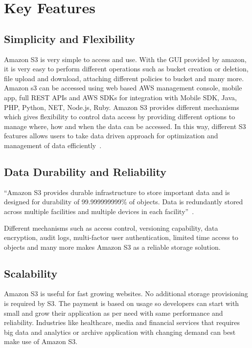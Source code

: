 \section{Key Features}


\subsection{Simplicity and Flexibility} 

Amazon S3 is very simple to access and use. With the GUI provided by amazon,
it is very easy to perform different operations such as bucket creation or
deletion, file upload and download, attaching different policies to bucket and 
many more. Amazon s3 can be accessed using web based AWS management console, 
mobile app, full REST APIs and AWS SDKs for integration with Mobile SDK, Java, 
PHP, Python, NET, Node.js, Ruby. Amazon S3 provides different mechanisms which 
gives flexibility to control data access by providing different options to 
manage where, how and when the data can be accessed. In this way, different S3 
features allows users to take data driven approach for optimization and 
management of data efficiently~\cite{hid-sp18-420-amazon-S3-FAQ}.


\subsection{Data Durability and Reliability} 

``Amazon S3 provides durable infrastructure to store important data and is 
designed for durability of 99.999999999\% of objects. Data is redundantly 
stored across multiple facilities and multiple devices in each 
facility''~\cite{hid-sp18-420-amazon-S3}.

Different mechanisms such as access control, versioning capability, data 
encryption, audit logs, multi-factor user authentication, limited time access 
to objects and many more makes Amazon S3 as a reliable storage solution.

\subsection{Scalability}

Amazon S3 is useful for fast growing websites. No additional storage 
provisioning is required by S3. The payment is based on usage so developers 
can start with small and grow their application as per need with same 
performance and reliability. 
Industries like healthcare, media and financial services that 
requires big data and analytics or archive application with changing demand 
can best make use of Amazon S3.

